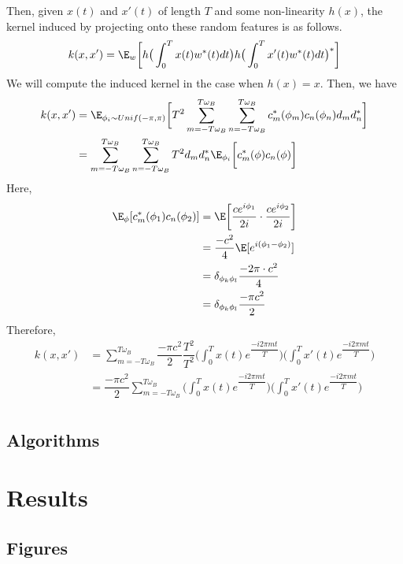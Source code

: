 \documentclass[11pt,letterpaper]{article}
\numberwithin{equation}{section} %
\numberwithin{figure}{section} %
\numberwithin{table}{section} %
\begin{document}
Then, given $x(t)$ and $x'(t)$ of length $T$ and some non-linearity $h(x)$, the kernel induced by projecting onto these random features is as follows. 
\begin{align*}
	k(x, x') = \E_w \bigg[ h\big(\int_0^T x(t) w^*(t) dt\big) h\big(\int_0^T x'(t) w^*(t) dt\big)^* \bigg] 
\end{align*}
We will compute the induced kernel in the case when $h(x) = x.$ Then, we have
\begin{align*}
k(x, x') &= \E_{\phi_i \sim Unif(-\pi, \pi)} \bigg[T^2 \sum_{m=-T \omega_B}^{T \omega_B} \sum_{n=-T \omega_B}^{T \omega_B} c_m^*(\phi_m) c_n(\phi_n) d_m d_n^* \bigg] \\
		&= \sum_{m=-T \omega_B}^{T \omega_B} \sum_{n=-T \omega_B}^{T \omega_B} T^2 d_m d_n^* \E_{\phi_i} \bigg[ c_m^*(\phi) c_n(\phi)\bigg]
\end{align*}
Here,
\begin{align*}
	\E_\phi [c_m^*(\phi_1) c_n(\phi_2)] &= \E \bigg[\dfrac{c e^{i \phi_1}}{2i} \cdot \dfrac{c e^{i \phi_2}}{2i} \bigg] \\
	&= \dfrac{-c^2}{4} \E[e^{i(\phi_1 - \phi_2)}] \\
	&= \delta_{\phi_k\phi_l} \dfrac{-2 \pi \cdot c^2}{4} \\
	&= \delta_{\phi_k \phi_l}\dfrac{-\pi c^2}{2}
\end{align*} 
Therefore,
\begin{align*}
	k(x, x') &= \sum_{m=-T\omega_B}^{T \omega_B} \dfrac{-\pi c^2}{2} \dfrac{T^2}{T^2} \bigg(\int_0^T x(t) e^{\dfrac{-i2\pi m t}{T}} \bigg) \bigg(\int_0^T x'(t) e^{\dfrac{-i2\pi m t}{T}} \bigg) \\
		&= \dfrac{- \pi c^2}{2}  \sum_{m=-T\omega_B}^{T \omega_B} \bigg(\int_0^T x(t) e^{\dfrac{-i2\pi m t}{T}} \bigg) \bigg(\int_0^T x'(t) e^{\dfrac{-i2\pi m t}{T}} \bigg) \\
\end{align*}

\subsection{Algorithms} %
\label{sub:algorithms}

\section{Results} %
\label{sec:results}

\subsection{Figures} %
\label{sub:figures}
\end{document}

